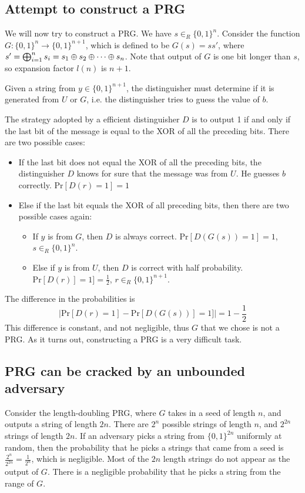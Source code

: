 \documentclass[11pt]{article}
\begin{document}
\subsection{Attempt to construct a PRG}
We will now try to construct a PRG. We have \(s \in _R \{0,1\}^n\).  Consider the function \(G \colon \{0, 1\}^n \to \{0, 1\}^{n+1}\), which is defined to be  \(G(s) = ss'\), where \(s' = \bigoplus _{i = 1}^n s_i = s_1 \oplus s_2 \oplus \cdots \oplus s_n\). Note that output of \(G\) is one bit longer than \(s\), so expansion factor \(l(n)\) is \(n + 1\). 

Given a string from \(y \in \{0, 1\}^{n+1}\), the distinguisher must determine if it is generated from \(U\) or \(G\), i.e. the distinguisher tries to guess the value of \(b\).  

The strategy adopted by a efficient distinguisher \(D\) is to output 1 if and only if the last bit of the message is equal to the XOR of all the preceding bits. There are two possible cases:
\begin{itemize}
    \item If the last bit does not equal the XOR of all the preceding bits, the distinguisher \(D\) knows for sure that the message was from \(U\). He guesses \(b\) correctly. \(\mathrm{Pr}[D(r) = 1] = 1\)
\item Else if the last bit equals the XOR of all preceding bits, then there are two possible cases again:
\begin{itemize}
    \item If \(y\) is from \(G\), then \(D\) is always correct.
    \(\mathrm{Pr}[D(G(s)) = 1] = 1\), \( s \in _R \{0, 1\}^n\).
    \item Else if \(y\) is from \(U\), then \(D\) is correct with half probability. \(\mathrm{Pr}[D(r)] = 1] = \frac{1}{2}\), \(r \in_R \{0, 1\}^{n+1}\).
\end{itemize}
\end{itemize}

The difference in the probabilities is 
\[\big| \mathrm{Pr}[D(r) = 1] - \mathrm{Pr}[D(G(s))] = 1] \big| = 1 - \frac{1}{2}\]
This difference is constant, and not negligible, thus \(G\) that we chose is not a PRG. As it turns out, constructing a PRG is a very difficult task.

\subsection{PRG can be cracked by an unbounded adversary}
Consider the length-doubling PRG, where \(G\) takes in a seed of length \(n\), and outputs a string of length \(2n\). There are \(2^n\) possible strings of length \(n\), and \(2^{2n}\) strings of length \(2n\). If an adversary picks a  string from \(\{0, 1\}^{2n}\) uniformly at random, then the probability that he picks a strings that came from a seed is \(\frac{2^n}{2^{2n}} = \frac{1}{2^n}\), which is negligible.  Most of the \(2n\) length strings do not appear as the output of \(G\). There is a negligible probability that he picks a string from the range of \(G\). 
\end{document}
